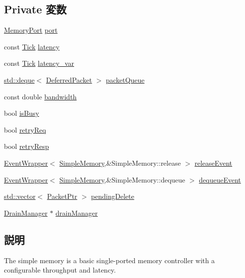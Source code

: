 \subsection*{Private 変数}
\begin{DoxyCompactItemize}
\item 
\hyperlink{classSimpleMemory_1_1MemoryPort}{MemoryPort} \hyperlink{classSimpleMemory_a55c076720c982014096b57cadebf9a14}{port}
\item 
const \hyperlink{base_2types_8hh_a5c8ed81b7d238c9083e1037ba6d61643}{Tick} \hyperlink{classSimpleMemory_a8291bf96dadb3695aea55321d10c0e77}{latency}
\item 
const \hyperlink{base_2types_8hh_a5c8ed81b7d238c9083e1037ba6d61643}{Tick} \hyperlink{classSimpleMemory_aa983b5b77f758b06806499ada4568803}{latency\_\-var}
\item 
\hyperlink{classstd_1_1deque}{std::deque}$<$ \hyperlink{classSimpleMemory_1_1DeferredPacket}{DeferredPacket} $>$ \hyperlink{classSimpleMemory_ae20fc3a6f9b02bebe5a9bff0c939c1f5}{packetQueue}
\item 
const double \hyperlink{classSimpleMemory_a18386495a208eab463cafbccfc28d5f4}{bandwidth}
\item 
bool \hyperlink{classSimpleMemory_a099f725f22a344e190121634f53328d8}{isBusy}
\item 
bool \hyperlink{classSimpleMemory_aab3b947b2633a30b5973a39b7e9b018a}{retryReq}
\item 
bool \hyperlink{classSimpleMemory_a6ddfdd4eb676d50001bda88567e6da14}{retryResp}
\item 
\hyperlink{classEventWrapper}{EventWrapper}$<$ \hyperlink{classSimpleMemory_1_1SimpleMemory}{SimpleMemory},\&SimpleMemory::release $>$ \hyperlink{classSimpleMemory_a152504c9de53c1ab4c16f4dceaa6bbfa}{releaseEvent}
\item 
\hyperlink{classEventWrapper}{EventWrapper}$<$ \hyperlink{classSimpleMemory_1_1SimpleMemory}{SimpleMemory},\&SimpleMemory::dequeue $>$ \hyperlink{classSimpleMemory_a8c2927c28d324098f4c7bb9b4d96bca1}{dequeueEvent}
\item 
\hyperlink{classstd_1_1vector}{std::vector}$<$ \hyperlink{classPacket}{PacketPtr} $>$ \hyperlink{classSimpleMemory_a21da4bea3554874b557428e4cce5d4a4}{pendingDelete}
\item 
\hyperlink{classDrainManager}{DrainManager} $\ast$ \hyperlink{classSimpleMemory_a329b71fb934a93312ca0aacbf5a3f982}{drainManager}
\end{DoxyCompactItemize}


\subsection{説明}
The simple memory is a basic single-\/ported memory controller with a configurable throughput and latency.

